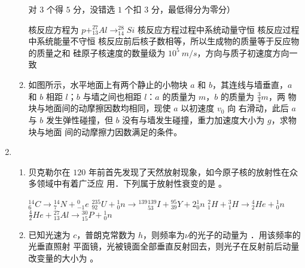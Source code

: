 \begin{enumerate}
\begin{enumerate}
对 $ 3 $ 个得 $ 5 $ 分，没错选 $ 1 $ 个扣 $ 3 $ 分，最低得分为零分）


\fivechoices
{核反应方程为 $p+_{13}^{27} Al \rightarrow_{14}^{28} Si$}
{核反应方程过程中系统动量守恒}
{核反应过程中系统能量不守恒}
{核反应前后核子数相等，所以生成物的质量等于反应物的质量之和}
{硅原子核速度的数量级为 $ 10^{5} \ m /s $，方向与质子初速度方向一致}




\item 
如图所示，水平地面上有两个静止的小物块 $ a $ 和 $ b $，其连线与墙垂直，$ a $ 和 $ b $ 相距
$ l $；$ b $ 与墙之间也相距 $ l $：$ a $ 的质量为 $ m $，$ b $ 的质量为
$  \frac{ 3 }{ 4 }  m $，两
物块与地面间的动摩擦因数均相同，现使 $ a $ 以初速度 $ v_{0} $ 向
右滑动，此后 $ a $ 与 $ b $ 发生弹性碰撞，但 $ b $ 没有与墙发生碰撞，重力加速度大小为 $ g $，求物块与地面
间的动摩擦力因数满足的条件。
\begin{figure}[h!]
	\flushright
	
\end{figure}




	
\end{enumerate}


\item 
{}
\begin{enumerate}
	\item
贝克勒尔在 $ 120 $ 年前首先发现了天然放射现象，如今原子核的放射性在众多领域中有着广泛应
用．下列属于放射性衰变的是 \underlinegap 。


\fourchoices
{${ }_{6}^{14} C \rightarrow{ }_{7}^{14} N+{ }_{-1}^{0} e$}
{${ }_{92}^{235} U+{ }_{0}^{1} n \rightarrow{ }^{139}{ }_{53}^{139} I+{ }_{39}^{95} Y+2{ }_{0}^{1} n$}
{${ }_{1}^{2} H+{ }_{1}^{3} H \rightarrow{ }_{2}^{4} He+{ }_{0}^{1} n$}
{$\frac{4}{2} He+{ }_{13}^{27} Al \rightarrow{ }_{15}^{30} P+{ }_{0}^{1} n$}





\item 
已知光速为 $ c $，普朗克常数为 $ h $，则频率为$ \nu $的光子的动量为 \underlinegap ．用该频率的光垂直照射
平面镜，光被镜面全部垂直反射回去，则光子在反射前后动量改变量的大小为 \underlinegap 。


\end{enumerate}
\end{enumerate}
